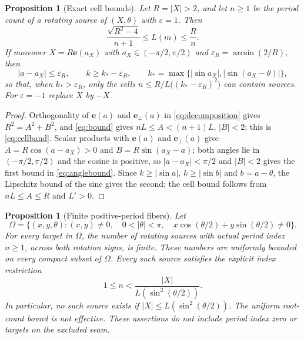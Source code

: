 \documentclass[11pt,a4paper]{article}
\newtheorem{proposition}[theorem]{Proposition}
\theoremstyle{remark}\newtheorem{remark}[theorem]{Remark}
\newcommand{\ee}{\mathbf e}
\newcommand{\ep}{\mathbf e_{\perp}}
\begin{document}
\begin{proposition}[Exact cell bounds]\label{prop:cellbounds}
Let $R=|X|>2$, and let $n\ge1$ be the period count of a rotating source of
$(X,\theta)$ with $\varepsilon=1$.  Then
\begin{equation}\label{eq:cellband}
 \frac{\sqrt{R^2-4}}{n+1}\le L(m)\le\frac Rn .
\end{equation}
If moreover $X=R\ee(a_X)$ with $a_X\in(-\pi/2,\pi/2)$ and
$\varepsilon_R=\arcsin(2/R)$, then
\begin{equation}\label{eq:anglebound}
 |a-a_X|\le\varepsilon_R,\qquad
 k\ge k_*-\varepsilon_R,\qquad k_*=\max\{|\sin a_X|,|\sin(a_X-\theta)|\},
\end{equation}
so that, when $k_*>\varepsilon_R$, only the cells $n\le R/L\bigl((k_*-\varepsilon_R)^2\bigr)$
can contain sources.  For $\varepsilon=-1$ replace $X$ by $-X$.
\end{proposition}
\begin{proof}
Orthogonality of $\ee(a)$ and $\ep(a)$ in \eqref{eq:decomposition} gives
$R^2=A^2+B^2$, and \eqref{eq:bound} gives $nL\le A<(n+1)L$, $|B|<2$; this
is \eqref{eq:cellband}.  Scalar products with $\ee(a)$ and $\ep(a)$ give
$A=R\cos(a-a_X)>0$ and $B=R\sin(a_X-a)$; both angles lie in
$(-\pi/2,\pi/2)$ and the cosine is positive, so $|a-a_X|<\pi/2$ and
$|B|<2$ gives the first bound in \eqref{eq:anglebound}.  Since
$k\ge|\sin a|$, $k\ge|\sin b|$ and $b=a-\theta$, the Lipschitz bound of
the sine gives the second; the cell bound follows from $nL\le A\le R$ and
$L'>0$.
\end{proof}

\begin{proposition}[Finite positive-period fibers]\label{prop:positive-finite}
Let
\[
 \Omega=\{(x,y,\theta): (x,y)\ne0,\quad 0<|\theta|<\pi,
       \quad x\cos(\theta/2)+y\sin(\theta/2)\ne0\}.
\]
For every target in $\Omega$, the number of rotating sources with actual
period index $n\ge1$, across both rotation signs, is finite. These numbers
are uniformly bounded on every compact subset of $\Omega$. Every such
source satisfies the explicit index restriction
\begin{equation}\label{eq:positive-index-bound}
 1\le n<\frac{|X|}{L(\sin^2(\theta/2))}.
\end{equation}
In particular, no such source exists if $|X|\le L(\sin^2(\theta/2))$.
The uniform root-count bound is not effective. These assertions do not
include period index zero or targets on the excluded seam.
\end{proposition}
\end{document}
